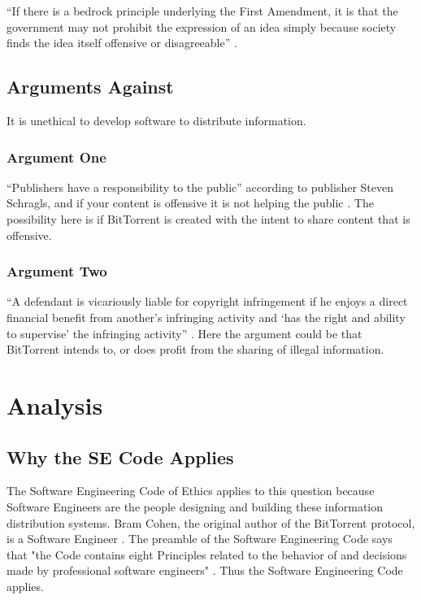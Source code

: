 \documentclass[11pt]{article}
\begin{document}
``If there is a bedrock principle underlying the First Amendment, it is that the government may not prohibit the expression of an idea simply because society finds the idea itself offensive or disagreeable'' \cite[414]{1989texas}.

\subsection{Arguments Against}
It is unethical to develop software to distribute information.

\subsubsection{Argument One}

``Publishers have a responsibility to the public'' according to publisher Steven Schragls, and if your content is offensive it is not helping the public \cite[46]{hawker}. The possibility here is if BitTorrent is created with the intent to share content that is offensive.

\subsubsection{Argument Two}

``A defendant is vicariously liable for copyright infringement if he enjoys a direct financial benefit from another's infringing activity and `has the right and ability to supervise' the infringing activity'' \cite{2000m}. Here the argument could be that BitTorrent intends to, or does profit from the sharing of illegal information.

\section{Analysis}

\subsection{Why the SE Code Applies}

The Software Engineering Code of Ethics applies to this question because Software Engineers are the people designing and building these information distribution systems. Bram Cohen, the original author of the BitTorrent protocol, is a Software Engineer \cite{cohen}. The preamble of the Software Engineering Code says that "the Code contains eight Principles related to the behavior of and decisions made by professional software engineers" \cite{secode}. Thus the Software Engineering Code applies.
\end{document}
